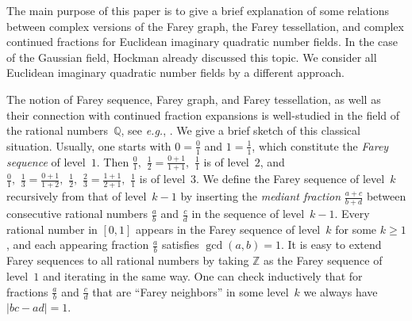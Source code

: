 \documentclass[graybox]{svmult}
\begin{document}
The main purpose of this paper is to give a brief explanation of some relations between complex versions of the Farey graph, the Farey tessellation, and complex continued fractions for  Euclidean imaginary quadratic number fields. In the case of the Gaussian field, Hockman \cite{H-1,H-2} already discussed this topic. We consider all Euclidean imaginary quadratic number fields by a different approach.  

The notion of Farey sequence, Farey graph, and Farey tessellation, as well as their connection with continued fraction expansions is well-studied in the field of the rational numbers~$\mathbb{Q}$, see {\em e.g.}, \cite{B-H-S,J-S-W,M}.  We give a brief sketch of this classical situation. Usually, one starts with $0 = \tfrac{0}{1}$ and $1=\tfrac{1}{1}$, which constitute the {\em Farey sequence} of level~$1$.  Then $\tfrac{0}{1}, \,\, \tfrac{1}{2} = \frac{0 + 1}{1+1}, \,\, \tfrac{1}{1}$ is 
of level~$2$, and $\tfrac{0}{1}, \,\, \tfrac{1}{3} = \tfrac{0+1}{1+2}, \,\, \tfrac{1}{2}, \,\, \tfrac{2}{3} = \tfrac{1+1}{2+ 1}, \,\, \tfrac{1}{1}$ is of level~$3$.  We define the Farey sequence of level~$k$ recursively from that of level~$k-1$ by inserting the {\em mediant fraction} $\tfrac{a + c}{b + d}$ between consecutive rational numbers $\tfrac{a}{b}$ and $\tfrac{c}{d}$ in the sequence of level~$k-1$.  Every rational number in $[0, 1]$ appears in the Farey sequence of level~$k$ for some $k \ge 1$, and each appearing fraction $\tfrac ab$ satisfies $\gcd(a,b)=1$.  It is easy to extend Farey sequences to all rational numbers by taking $\mathbb Z$ as the Farey sequence of level~$1$ and iterating in the same way.  One can check inductively that for fractions $\tfrac{a}{b}$ and $\tfrac{c}{d}$ that are ``Farey neighbors'' in some level~$k$ we always have $|bc-ad|=1$.
\end{document}
